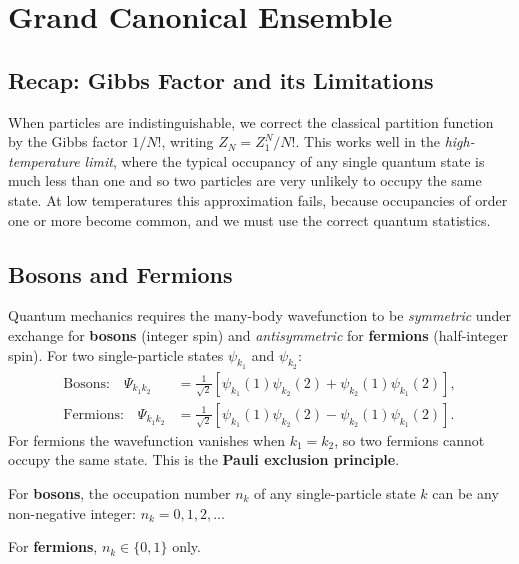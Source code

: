 \chapter{Grand Canonical Ensemble}

\section{Recap: Gibbs Factor and its Limitations}

When particles are indistinguishable, we correct the classical partition function
by the Gibbs factor $1/N!$, writing $Z_N = Z_1^N/N!$.  This works well in the
\emph{high-temperature limit}, where the typical occupancy of any single quantum
state is much less than one and so two particles are very unlikely to occupy the
same state.  At low temperatures this approximation fails, because occupancies of
order one or more become common, and we must use the correct quantum statistics.

\section{Bosons and Fermions}

Quantum mechanics requires the many-body wavefunction to be \emph{symmetric}
under exchange for \textbf{bosons} (integer spin) and \emph{antisymmetric} for
\textbf{fermions} (half-integer spin).  For two single-particle states $\psi_{k_1}$
and $\psi_{k_2}$:
\begin{align}
    \text{Bosons:}\quad
    \Psi_{k_1k_2}
    &= \frac{1}{\sqrt{2}}\!\left[\psi_{k_1}(1)\psi_{k_2}(2)
       +\psi_{k_2}(1)\psi_{k_1}(2)\right],\\
    \text{Fermions:}\quad
    \Psi_{k_1k_2}
    &= \frac{1}{\sqrt{2}}\!\left[\psi_{k_1}(1)\psi_{k_2}(2)
       -\psi_{k_2}(1)\psi_{k_1}(2)\right].
\end{align}
For fermions the wavefunction vanishes when $k_1=k_2$, so two fermions cannot
occupy the same state.  This is the \textbf{Pauli exclusion principle}.

\begin{fact}
For \textbf{bosons}, the occupation number $n_k$ of any single-particle state
$k$ can be any non-negative integer: $n_k = 0,1,2,\ldots$

For \textbf{fermions}, $n_k\in\{0,1\}$ only.
\end{fact}

